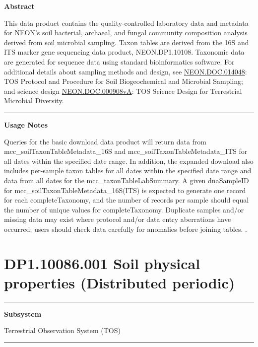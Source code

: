 \documentclass[]{article}
\begin{document}
\textbf{Abstract}

This data product contains the quality-controlled laboratory data and
metadata for NEON's soil bacterial, archaeal, and fungal community
composition analysis derived from soil microbial sampling. Taxon tables
are derived from the 16S and ITS marker gene sequencing data product,
NEON.DP1.10108. Taxonomic data are generated for sequence data using
standard bioinformatics software. For additional details about sampling
methods and design, see
\href{http://data.neonscience.org/api/v0/documents/NEON.DOC.014048vK}{NEON.DOC.014048}:
TOS Protocol and Procedure for Soil Biogeochemical and Microbial
Sampling; and science design
\href{http://data.neonscience.org/api/v0/documents/NEON.DOC.000908vA}{NEON.DOC.000908vA}:
TOS Science Design for Terrestrial Microbial Diversity.

\begin{center}\rule{0.5\linewidth}{\linethickness}\end{center}

\textbf{Usage Notes}

Queries for the basic download data product will return data from
mcc\_soilTaxonTableMetadata\_16S and mcc\_soilTaxonTableMetadata\_ITS
for all dates within the specified date range. In addition, the expanded
download also includes per-sample taxon tables for all dates within the
specified date range and data from all dates for the
mcc\_taxonTableLabSummary. A given dnaSampleID for
mcc\_soilTaxonTableMetadata\_16S(ITS) is expected to generate one record
for each completeTaxonomy, and the number of records per sample should
equal the number of unique values for completeTaxonomy. Duplicate
samples and/or missing data may exist where protocol and/or data entry
aberrations have occurred; users should check data carefully for
anomalies before joining tables. \newpage
.

\section{DP1.10086.001 Soil physical properties (Distributed
periodic)}\label{dp1.10086.001-soil-physical-properties-distributed-periodic}

\begin{center}\rule{0.5\linewidth}{\linethickness}\end{center}

\textbf{Subsystem}

Terrestrial Observation System (TOS)

\begin{center}\rule{0.5\linewidth}{\linethickness}\end{center}
\end{document}
